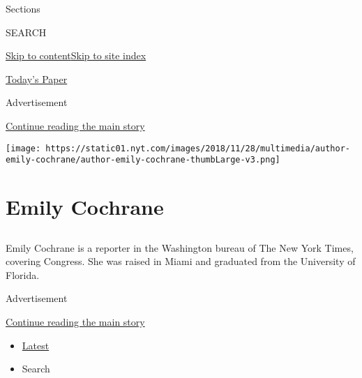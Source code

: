 Sections

SEARCH

\protect\hyperlink{site-content}{Skip to
content}\protect\hyperlink{site-index}{Skip to site index}

\href{https://myaccount.nytimes.com/auth/login?response_type=cookie\&client_id=vi}{}

\href{https://www.nytimes.com/section/todayspaper}{Today's Paper}

Advertisement

\protect\hyperlink{after-top}{Continue reading the main story}

\texttt{[image: https://static01.nyt.com/images/2018/11/28/multimedia/author-emily-cochrane/author-emily-cochrane-thumbLarge-v3.png]}

\hypertarget{emily-cochrane}{%
\section{Emily Cochrane}\label{emily-cochrane}}

\subsection{}

Emily Cochrane is a reporter in the Washington bureau of The New York
Times, covering Congress. She was raised in Miami and graduated from the
University of Florida.

Advertisement

\protect\hyperlink{after-mid1}{Continue reading the main story}

\begin{itemize}
\tightlist
\item
  \protect\hyperlink{stream-panel}{Latest}
\item
  Search
\end{itemize}


